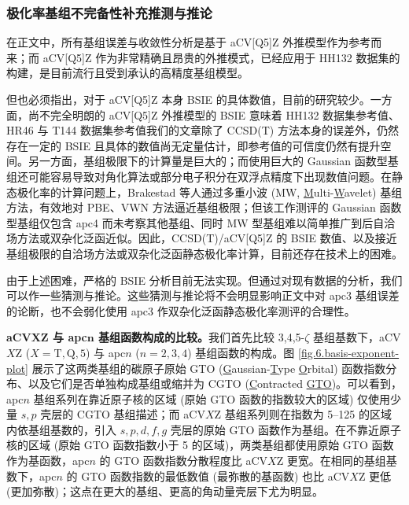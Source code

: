 \subsubsection{极化率基组不完备性补充推测与推论}
\label{sec.6.supp-bsie}

在正文中，所有基组误差与收敛性分析是基于 aCV[Q5]Z 外推模型作为参考而来；而 aCV[Q5]Z 作为非常精确且昂贵的外推模式，已经应用于 HH132 数据集的构建\cite{Hait-Head-Gordon.PCCP.2018}，是目前流行且受到承认的高精度基组模型。

但也必须指出，对于 aCV[Q5]Z 本身 BSIE 的具体数值，目前的研究较少。一方面，尚不完全明朗的 aCV[Q5]Z 外推模型的 BSIE 意味着 HH132 数据集参考值\cite{Hait-Head-Gordon.PCCP.2018}、HR46 与 T144 数据集参考值\alert{我们的文章}除了 CCSD(T) 方法本身的误差外，仍然存在一定的 BSIE 且具体的数值尚无定量估计，即参考值的可信度仍然有提升空间。另一方面，基组极限下的计算量是巨大的；而使用巨大的 Gaussian 函数型基组还可能容易导致对角化算法或部分电子积分在双浮点精度下出现数值问题。在静态极化率的计算问题上，Brakestad 等人\cite{Brakestad-Frediani.JCTC.2020}通过多重小波 (MW, \underline{M}ulti-\underline{W}avelet) 基组方法，有效地对 PBE、VWN 方法逼近基组极限；但该工作测评的 Gaussian 函数型基组仅包含 apc4 而未考察其他基组、同时 MW 型基组难以简单推广到后自洽场方法或双杂化泛函近似。因此，CCSD(T)/aCV[Q5]Z 的 BSIE 数值、以及接近基组极限的自洽场方法或双杂化泛函静态极化率计算，目前还存在技术上的困难。

由于上述困难，严格的 BSIE 分析目前无法实现。但通过对现有数据的分析，我们可以作一些猜测与推论。这些猜测与推论将不会明显影响正文中对 apc3 基组误差的论断，也不会弱化使用 apc3 作双杂化泛函静态极化率测评的合理性。

\textbf{aCV$\bm{X}$Z 与 apc$\bm{n}$ 基组函数构成的比较。}我们首先比较 3,4,5-$\zeta$ 基组基数下，aCV$X$Z ($X=\mathrm{T,Q,5}$) 与 apc$n$ ($n=2,3,4$) 基组函数的构成。图 \ref{fig.6.basis-exponent-plot} 展示了这两类基组的碳原子原始 GTO (\underline{G}aussian-\underline{T}ype \underline{O}rbital) 函数指数分布、以及它们是否单独构成基组或缩并为 CGTO (\underline{C}ontracted \underline{GTO})。可以看到，apc$n$ 基组系列在靠近原子核的区域 (原始 GTO 函数的指数较大的区域) 仅使用少量 $s, p$ 壳层的 CGTO 基组描述；而 aCV$X$Z 基组系列则在指数为 5--125 的区域内依基组基数的，引入 $s, p, d, f, g$ 壳层的原始 GTO 函数作为基组。在不靠近原子核的区域 (原始 GTO 函数指数小于 5 的区域)，两类基组都使用原始 GTO 函数作为基函数，apc$n$ 的 GTO 函数指数分散程度比 aCV$X$Z 更宽。在相同的基组基数下，apc$n$ 的 GTO 函数指数的最低数值 (最弥散的基函数) 也比 aCV$X$Z 更低 (更加弥散)；这点在更大的基组、更高的角动量壳层下尤为明显。

